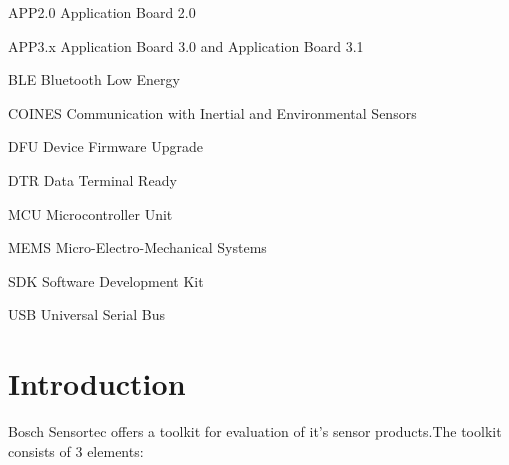 \documentclass[11pt,headings=small]{scrartcl}
\begin{document}
\bstfirstpage
\tableofcontents
\newpage

\begin{Nomencl}[5em]
	\item[APP2.0] Application Board 2.0
	\item[APP3.x] Application Board 3.0 and Application Board 3.1
	\item[BLE] Bluetooth Low Energy
	\item[COINES] Communication with Inertial and Environmental Sensors
	\item[DFU] Device Firmware Upgrade
	\item[DTR] Data Terminal Ready
	\item[MCU] Microcontroller Unit
	\item[MEMS] Micro-Electro-Mechanical Systems
	\item[SDK] Software Development Kit
	\item[USB] Universal Serial Bus
\end{Nomencl}

\newpage

\section{Introduction}

Bosch Sensortec offers a toolkit for evaluation of it's sensor products.The toolkit consists of 3 elements:
\end{document}
